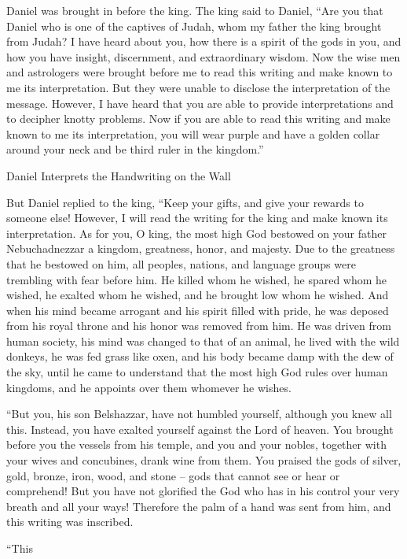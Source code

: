 {Daniel
was brought in
before
the king.
The king
said
to Daniel,
“Are you
that
Daniel
who
is one
of
the captives
of Judah,
whom
my father
the king
brought
from
Judah?
I have heard
about
you, how there
is a spirit
of the gods
in you, and how you have
insight,
discernment,
and extraordinary
wisdom.
Now
the wise men
and astrologers
were brought
before
me to read
this
writing
and make known
to me its interpretation.
But they were unable
to disclose
the interpretation
of the message.
However, I
have heard
that
you
are able
to provide interpretations
and to decipher
knotty problems.
Now
if
you are able
to read
this writing
and make known
to me its interpretation,
you will wear
purple
and have a golden
collar
around
your neck
and be third
ruler
in the kingdom.”
\par }{\SH Daniel Interprets the Handwriting on the Wall
\par }{\PP {}But
Daniel
replied
to the king,
“Keep your gifts,
and give
your rewards
to someone
else! However,
I will read
the writing
for the king
and make known
its interpretation.
As for you,
O king,
the most high
God
bestowed
on your father
Nebuchadnezzar
a kingdom,
greatness,
honor,
and majesty.
Due to the greatness
that
he bestowed
on him, all
peoples,
nations,
and language groups
were
trembling
with fear
before
him. He killed
whom
he wished,
he spared
whom
he wished,
he exalted
whom
he wished,
and he brought low whom he wished.
And when
his mind
became arrogant
and his spirit
filled
with pride,
he was deposed
from
his royal
throne
and his honor
was removed
from him.
He was driven
from
human
society,
his mind
was changed
to that
of an animal,
he lived
with
the wild donkeys,
he was fed
grass
like oxen,
and his body
became damp
with the dew
of the sky,
until
he came to understand
that
the most high
God
rules over
human
kingdoms,
and he appoints
over
them whomever
he wishes.
\par }{\PP {}“But you,
his son
Belshazzar,
have not
humbled
yourself,
although
you knew
all
this.
Instead,
you have exalted
yourself against the Lord
of heaven.
You brought
before
you the vessels
from
his temple,
and you
and your nobles,
together with your wives
and concubines,
drank
wine
from them. You praised
the gods
of silver,
gold,
bronze,
iron,
wood,
and stone
– gods that cannot
see
or
hear
or
comprehend! But you have not
glorified
the God
who
has in his control
your very breath
and all
your ways!
Therefore
the palm
of a hand
was sent
from
him,
and this
writing
was inscribed.
\par }{\PP {}“This
}
